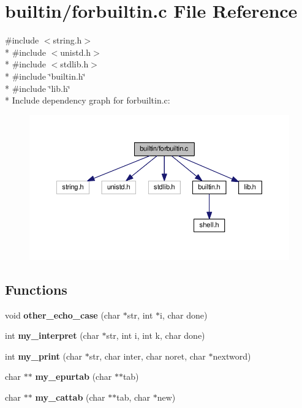 \section{builtin/forbuiltin.c File Reference}
\label{forbuiltin_8c}
{\ttfamily \#include $<$string.\-h$>$}\\*
{\ttfamily \#include $<$unistd.\-h$>$}\\*
{\ttfamily \#include $<$stdlib.\-h$>$}\\*
{\ttfamily \#include \char`\"{}builtin.\-h\char`\"{}}\\*
{\ttfamily \#include \char`\"{}lib.\-h\char`\"{}}\\*
Include dependency graph for forbuiltin.\-c\-:\nopagebreak
\begin{figure}[H]
\begin{center}
\leavevmode
\includegraphics[width=350pt]{forbuiltin_8c__incl}
\end{center}
\end{figure}
\subsection*{Functions}
\begin{DoxyCompactItemize}
\item 
void {\bf other\-\_\-echo\-\_\-case} (char $\ast$str, int $\ast$i, char done)
\item 
int {\bf my\-\_\-interpret} (char $\ast$str, int i, int k, char done)
\item 
int {\bf my\-\_\-print} (char $\ast$str, char inter, char noret, char $\ast$nextword)
\item 
char $\ast$$\ast$ {\bf my\-\_\-epurtab} (char $\ast$$\ast$tab)
\item 
char $\ast$$\ast$ {\bf my\-\_\-cattab} (char $\ast$$\ast$tab, char $\ast$new)
\end{DoxyCompactItemize}
